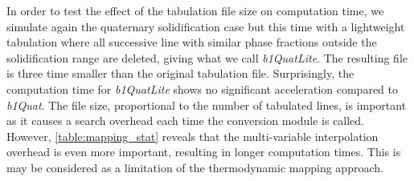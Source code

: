 In order to test the effect of the tabulation file size on computation time, we simulate again the quaternary solidification case but this time with a lightweight
tabulation where all successive line with similar phase fractions outside the solidification range are deleted, giving what we call \emph{b1QuatLite}. The 
resulting file is three time smaller than the original tabulation file. Surprisingly, the computation time for \emph{b1QuatLite} shows no significant acceleration 
compared to \emph{b1Quat}. The file size, proportional to the number of tabulated lines, is important as it causes a search overhead each time the conversion module
is called. However, \cref{table:mapping_stat} reveals that the multi-variable interpolation overhead is even more important, resulting in longer computation times.
This is may be considered as a limitation of the thermodynamic mapping approach.



\begin{table}[htbp]
\centering
\caption{Information table showing the tabulations size  for each alloy obtained by the same mapping resolution for temperature and composition, 
depending on the number of solute elements and phases. The computation time corresponds to the CPU time of a simulation running on 20 cores.}
\label{table:mapping_stat}
\end{table}

